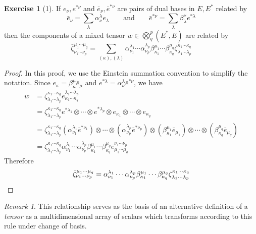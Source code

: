 \documentclass[letterpaper,12pt]{article}
\newcommand{\tprod}{\otimes}
\newcommand{\bigtprod}{\bigotimes}
\newcommand{\medtprod}{{\textstyle\bigtprod}}
\theoremstyle{definition}
\newtheorem*{exer}{Exercise}
\theoremstyle{remark}
\newtheorem*{rmk}{Remark}
\begin{document}
\begin{exer}[1]
If \(e_{\nu},e^{*\nu}\) and \(\bar{e}_{\nu},\bar{e}^{*\nu}\) are pairs of dual bases in \(E,E^*\) related by
\[\bar{e}_{\nu}=\sum_{\lambda}\alpha_{\nu}^{\lambda}e_{\lambda}\qquad\text{and}\qquad\bar{e}^{*\nu}=\sum_{\lambda}\beta^{\nu}_{\lambda}e^{*\lambda}\]
then the components of a mixed tensor \(w\in\medtprod^p_q(E^*,E)\) are related by
\[\bar{\zeta}^{\mu_1\cdots\mu_q}_{\nu_1\cdots\nu_p}=\sum_{(\kappa),(\lambda)}\alpha_{\nu_1}^{\lambda_1}\cdots\alpha_{\nu_p}^{\lambda_p}\beta^{\mu_1}_{\kappa_1}\cdots\beta^{\mu_q}_{\kappa_q}\zeta^{\kappa_1\cdots\kappa_q}_{\lambda_1\cdots\lambda_p}\]
\end{exer}
\begin{proof}
In this proof, we use the Einstein summation convention to simplify the notation. Since \(e_{\kappa}=\beta_{\kappa}^{\mu}\bar{e}_{\mu}\) and \(e^{*\lambda}=\alpha^{\lambda}_{\nu}\bar{e}^{*\nu}\), we have
\begin{align*}
w&=\zeta^{\kappa_1\cdots\kappa_q}_{\lambda_1\cdots\lambda_p}e^{\lambda_1\cdots\lambda_p}_{\kappa_1\cdots\kappa_q}\\
	&=\zeta^{\kappa_1\cdots\kappa_q}_{\lambda_1\cdots\lambda_p}e^{*\lambda_1}\tprod\cdots\tprod e^{*\lambda_p}\tprod e_{\kappa_1}\tprod\cdots\tprod e_{\kappa_q}\\
	&=\zeta^{\kappa_1\cdots\kappa_q}_{\lambda_1\cdots\lambda_p}(\alpha^{\lambda_1}_{\nu_1}\bar{e}^{*\nu_1})\tprod\cdots\tprod(\alpha^{\lambda_p}_{\nu_p}\bar{e}^{*\nu_p})\tprod(\beta_{\kappa_1}^{\mu_1}\bar{e}_{\mu_1})\tprod\cdots\tprod(\beta_{\kappa_q}^{\mu_q}\bar{e}_{\mu_q})\\
	&=\zeta^{\kappa_1\cdots\kappa_q}_{\lambda_1\cdots\lambda_p}\alpha^{\lambda_1}_{\nu_1}\cdots\alpha^{\lambda_p}_{\nu_p}\beta_{\kappa_1}^{\mu_1}\cdots\beta_{\kappa_q}^{\mu_q}\bar{e}^{\nu_1\cdots\nu_p}_{\mu_1\cdots\mu_q}
\end{align*}
Therefore
\[\bar{\zeta}^{\mu_1\cdots\mu_q}_{\nu_1\cdots\nu_p}=\alpha_{\nu_1}^{\lambda_1}\cdots\alpha_{\nu_p}^{\lambda_p}\beta^{\mu_1}_{\kappa_1}\cdots\beta^{\mu_q}_{\kappa_q}\zeta^{\kappa_1\cdots\kappa_q}_{\lambda_1\cdots\lambda_p}\qedhere\]
\end{proof}
\begin{rmk}
This relationship serves as the basis of an alternative definition of a \emph{tensor} as a multidimensional array of scalars which transforms according to this rule under change of basis.
\end{rmk}
\end{document}
